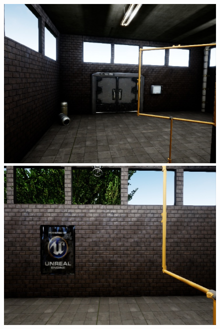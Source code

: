 \documentclass{article}
\begin{document}
\begin{figure}[htbp]
	\begin{minipage}{0.3\linewidth}
	\includegraphics[width=\linewidth]{size_examples/015-025 (2).jpg}
\end{minipage}
\hfill
\begin{minipage}{0.3\linewidth}
	\includegraphics[width=\linewidth]{size_examples/015-025 (3).jpg}
\end{minipage}
\hfill
\begin{minipage}{0.3\linewidth}

\end{minipage}
\end{figure}
\end{document}
